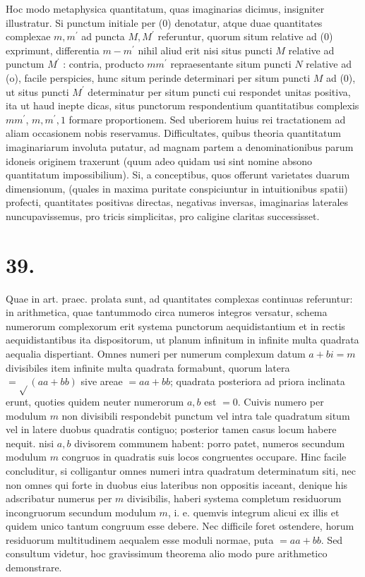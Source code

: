 \documentclass[10pt]{article}
\begin{document}
Hoc modo metaphysica quantitatum, quas imaginarias dicimus, insigniter illustratur. Si punctum initiale per (0) denotatur, atque duae quantitates complexae \(m, m^{\prime}\) ad puncta \(M, M^{\prime}\) referuntur, quorum situm relative ad (0) exprimunt, differentia \(m-m^{\prime}\) nihil aliud erit nisi situs puncti \(M\) relative ad punctum \(M^{\prime}\) : contria, producto \(m m^{\prime}\) repraesentante situm puncti \(N\) relative ad (o), facile perspicies, hunc situm perinde determinari per situm puncti \(M\) ad (0), ut situs puncti \(M^{\prime}\) determinatur per situm puncti cui respondet unitas positiva, ita ut haud inepte dicas, situs punctorum respondentium quantitatibus complexis \(m m^{\prime}\),
\(m, m^{\prime}, 1\) formare proportionem. Sed uberiorem huius rei tractationem ad aliam occasionem nobis reservamus. Difficultates, quibus theoria quantitatum imaginariarum involuta putatur, ad magnam partem a denominationibus parum idoneis originem traxerunt (quum adeo quidam usi sint nomine absono quantitatum impossibilium). Si, a conceptibus, quos offerunt varietates duarum dimensionum, (quales in maxima puritate conspiciuntur in intuitionibus spatii) profecti, quantitates positivas directas, negativas inversas, imaginarias laterales nuncupavissemus, pro tricis simplicitas, pro caligine claritas successisset.

\section*{39.}
Quae in art. praec. prolata sunt, ad quantitates complexas continuas referuntur: in arithmetica, quae tantummodo circa numeros integros versatur, schema numerorum complexorum erit systema punctorum aequidistantium et in rectis aequidistantibus ita dispositorum, ut planum infinitum in infinite multa quadrata aequalia dispertiant. Omnes numeri per numerum complexum datum \(a+b i=m\) divisibiles item infinite multa quadrata formabunt, quorum latera \(=\sqrt{ }(a a+b b)\) sive areae \(=a a+b b\); quadrata posteriora ad priora inclinata erunt, quoties quidem neuter numerorum \(a, b\) est \(=0\). Cuivis numero per modulum \(m\) non divisibili respondebit punctum vel intra tale quadratum situm vel in latere duobus quadratis contiguo; posterior tamen casus locum habere nequit. nisi \(a, b\) divisorem communem habent: porro patet, numeros secundum modulum \(m\) congruos in quadratis suis locos congruentes occupare. Hinc facile concluditur, si colligantur omnes numeri intra quadratum determinatum siti, nec non omnes qui forte in duobus eius lateribus non oppositis iaceant, denique his adscribatur numerus per \(m\) divisibilis, haberi systema completum residuorum incongruorum secundum modulum \(m\), i. e. quemvis integrum alicui ex illis et quidem unico tantum congruum esse debere. Nec difficile foret ostendere, horum residuorum multitudinem aequalem esse moduli normae, puta \(=a a+b b\). Sed consultum videtur, hoc gravissimum theorema alio modo pure arithmetico demonstrare.
\end{document}
